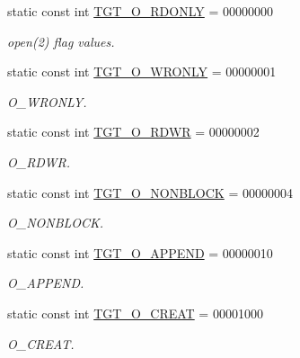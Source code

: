 \begin{Indent}{\bf }\par
{\em \label{_amgrpd41d8cd98f00b204e9800998ecf8427e}
 }\begin{DoxyCompactItemize}
\item 
static const int \hyperlink{classAlphaTru64_ad266b23a0ae07d1833e18bae651f3411}{TGT\_\-O\_\-RDONLY} = 00000000
\begin{DoxyCompactList}\small\item\em open(2) flag values. \item\end{DoxyCompactList}\item 
static const int \hyperlink{classAlphaTru64_a6156c069cefe05ce3cce033b2e0c2de2}{TGT\_\-O\_\-WRONLY} = 00000001
\begin{DoxyCompactList}\small\item\em O\_\-WRONLY. \item\end{DoxyCompactList}\item 
static const int \hyperlink{classAlphaTru64_ac6fa9ecf5d2f3314f197698f1099e2ac}{TGT\_\-O\_\-RDWR} = 00000002
\begin{DoxyCompactList}\small\item\em O\_\-RDWR. \item\end{DoxyCompactList}\item 
static const int \hyperlink{classAlphaTru64_a0ea5420b4c9b45ba342a266fb77ac942}{TGT\_\-O\_\-NONBLOCK} = 00000004
\begin{DoxyCompactList}\small\item\em O\_\-NONBLOCK. \item\end{DoxyCompactList}\item 
static const int \hyperlink{classAlphaTru64_af11adc5404ea3780a5ce2829cc3710b7}{TGT\_\-O\_\-APPEND} = 00000010
\begin{DoxyCompactList}\small\item\em O\_\-APPEND. \item\end{DoxyCompactList}\item 
static const int \hyperlink{classAlphaTru64_aec02e04ca367e6c3f4b46e4edc12efac}{TGT\_\-O\_\-CREAT} = 00001000
\begin{DoxyCompactList}\small\item\em O\_\-CREAT. \item\end{DoxyCompactList}\item 

\end{DoxyCompactItemize}
\end{Indent}
